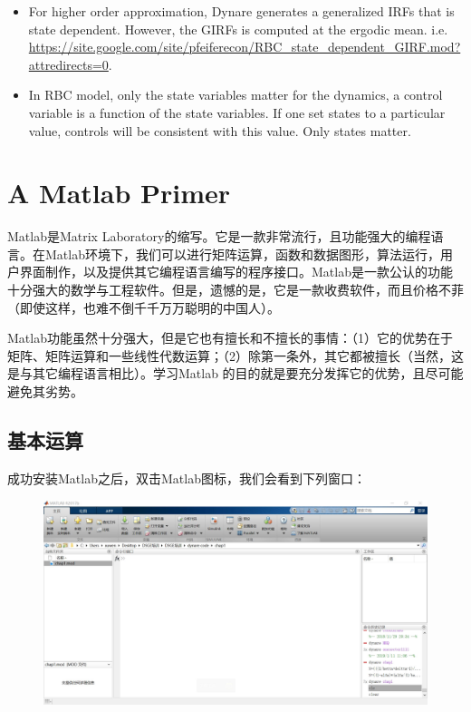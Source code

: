 \documentclass[cn,10pt,math=newtx,citestyle=gb7714-2015,bibstyle=gb7714-2015]{elegantbook}
\begin{document}
{{\begin{enumerate}
{\begin{itemize}
				\item For higher order approximation, Dynare generates a generalized IRFs that is state dependent. However, the GIRFs is computed at the ergodic mean. i.e. \url{https://site.google.com/site/pfeiferecon/RBC\_state\_dependent\_GIRF.mod?attredirects=0}.
				\item In RBC model, only the state variables matter for the dynamics, a control variable is a function of the state variables. If one set states to a particular value, controls will be consistent with this value. Only states matter.
			\end{itemize}
		}
	\end{enumerate}
	

	
	\chapter{A Matlab Primer}
	
	
	Matlab是Matrix Laboratory的缩写。它是一款非常流行，且功能强大的编程语言。在Matlab环境下，我们可以进行矩阵运算，函数和数据图形，算法运行，用户界面制作，以及提供其它编程语言编写的程序接口。Matlab是一款公认的功能十分强大的数学与工程软件。但是，遗憾的是，它是一款收费软件，而且价格不菲（即使这样，也难不倒千千万万聪明的中国人）。
	
	Matlab功能虽然十分强大，但是它也有擅长和不擅长的事情：（1）它的优势在于矩阵、矩阵运算和一些线性代数运算；（2）除第一条外，其它都被擅长（当然，这是与其它编程语言相比）。学习Matlab 的目的就是要充分发挥它的优势，且尽可能避免其劣势。
	
	\section{基本运算}
	
	成功安装Matlab之后，双击Matlab图标，我们会看到下列窗口：
	\begin{figure}[htbp!]
		\centering
		\includegraphics[width=0.8\linewidth]{FIG/matlab.jpg}
		

\end{figure}}}
\end{document}
